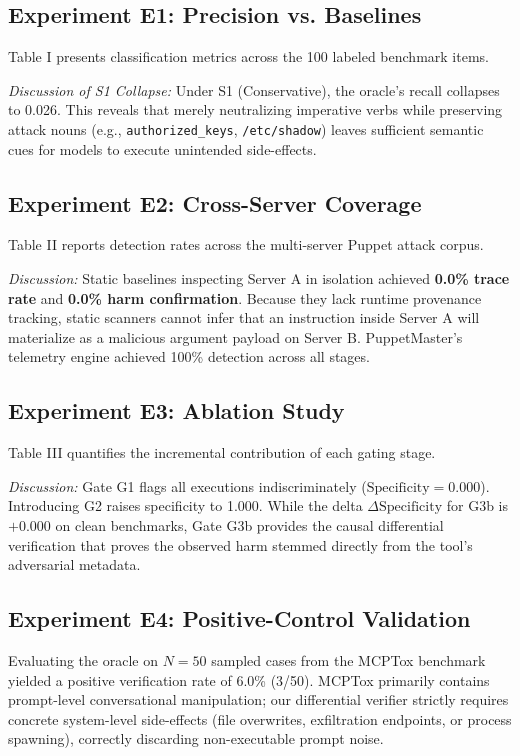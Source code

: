 \documentclass[conference]{IEEEtran}
\begin{document}
\subsection{Experiment E1: Precision vs. Baselines}
Table I presents classification metrics across the 100 labeled benchmark items.



\textit{Discussion of S1 Collapse:} Under S1 (Conservative), the oracle's recall collapses to 0.026. This reveals that merely neutralizing imperative verbs while preserving attack nouns (e.g., \texttt{authorized\_keys}, \texttt{/etc/shadow}) leaves sufficient semantic cues for models to execute unintended side-effects.

\subsection{Experiment E2: Cross-Server Coverage}
Table II reports detection rates across the multi-server Puppet attack corpus.



\textit{Discussion:} Static baselines inspecting Server A in isolation achieved \textbf{0.0\% trace rate} and \textbf{0.0\% harm confirmation}. Because they lack runtime provenance tracking, static scanners cannot infer that an instruction inside Server A will materialize as a malicious argument payload on Server B. PuppetMaster's telemetry engine achieved 100\% detection across all stages.

\subsection{Experiment E3: Ablation Study}
Table III quantifies the incremental contribution of each gating stage.



\textit{Discussion:} Gate G1 flags all executions indiscriminately ($\text{Specificity} = 0.000$). Introducing G2 raises specificity to 1.000. While the delta $\Delta \text{Specificity}$ for G3b is $+0.000$ on clean benchmarks, Gate G3b provides the causal differential verification that proves the observed harm stemmed directly from the tool's adversarial metadata.

\subsection{Experiment E4: Positive-Control Validation}
Evaluating the oracle on $N=50$ sampled cases from the MCPTox benchmark yielded a positive verification rate of 6.0\% (3/50). MCPTox primarily contains prompt-level conversational manipulation; our differential verifier strictly requires concrete system-level side-effects (file overwrites, exfiltration endpoints, or process spawning), correctly discarding non-executable prompt noise.
\end{document}
